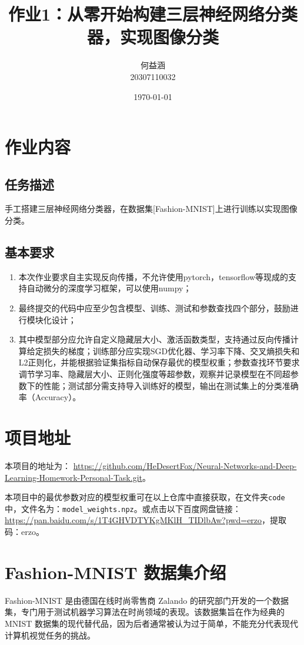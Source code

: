\documentclass[a4paper,12pt]{article}
\title{作业1：从零开始构建三层神经网络分类器，实现图像分类}
\author{何益涵 \\ 20307110032}
\date{\today}
\begin{document}
\maketitle


\section{作业内容}
\subsection{任务描述}
手工搭建三层神经网络分类器，在数据集[Fashion-MNIST]上进行训练以实现图像分类。

\subsection{基本要求}
\begin{enumerate}
\item 本次作业要求自主实现反向传播，不允许使用pytorch，tensorflow等现成的支持自动微分的深度学习框架，可以使用numpy；
\item 最终提交的代码中应至少包含模型、训练、测试和参数查找四个部分，鼓励进行模块化设计；
\item 其中模型部分应允许自定义隐藏层大小、激活函数类型，支持通过反向传播计算给定损失的梯度；训练部分应实现SGD优化器、学习率下降、交叉熵损失和L2正则化，并能根据验证集指标自动保存最优的模型权重；参数查找环节要求调节学习率、隐藏层大小、正则化强度等超参数，观察并记录模型在不同超参数下的性能；测试部分需支持导入训练好的模型，输出在测试集上的分类准确率（Accuracy）。
\end{enumerate}

\section{项目地址}
本项目的地址为：
\url{https://github.com/HeDesertFox/Neural-Networks-and-Deep-Learning-Homework-Personal-Task.git}。

本项目中的最优参数对应的模型权重可在以上仓库中直接获取，在文件夹\texttt{code}中，文件名为：\texttt{model\_weights.npz}。或点击以下百度网盘链接：\url{https://pan.baidu.com/s/1T4GHVDTYKgMKlH_TIDlbAw?pwd=erzo}，提取码：erzo。


\section{Fashion-MNIST 数据集介绍}

Fashion-MNIST 是由德国在线时尚零售商 Zalando 的研究部门开发的一个数据集，专门用于测试机器学习算法在时尚领域的表现。该数据集旨在作为经典的 MNIST 数据集的现代替代品，因为后者通常被认为过于简单，不能充分代表现代计算机视觉任务的挑战。
\end{document}
